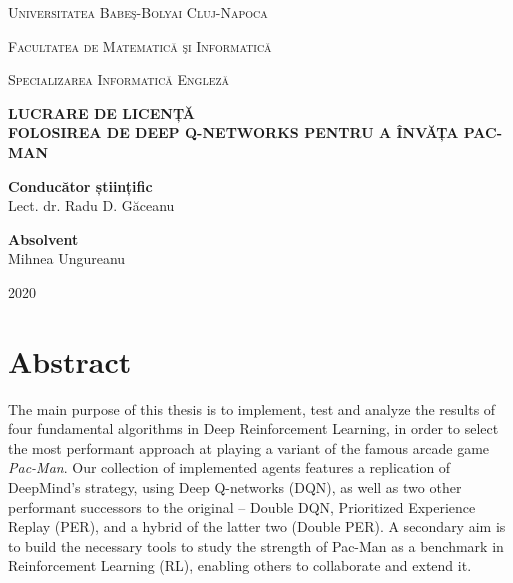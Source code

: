 \documentclass[12pt,twoside]{report}
\newcommand\blankpage{%
    \null
    \thispagestyle{empty}%
    \addtocounter{page}{-1}%
    \newpage}
\begin{document}
\begin{titlepage}
    \center %
    
    {\scshape\LARGE Universitatea Babeş-Bolyai Cluj-Napoca \par}
    \vspace{0.125cm}
    {\scshape\LARGE Facultatea de Matematică şi Informatică \par}
    \vspace{0.125cm}
    {\scshape\LARGE Specializarea Informatică Engleză \par}
    \vspace{5cm}
    
    {
        \bfseries
        \LARGE LUCRARE DE LICENȚĂ \\[1.5cm]
        \LARGE \uppercase{Folosirea de Deep Q-networks pentru a învĂȚa Pac-Man}
    }\\[4cm]
    
    \begin{flushleft}
        \Large
            \textbf{Conducător științific}
            \vspace{0.2cm}\\
        \Large
            Lect. dr. Radu D. Găceanu
            \vspace{0.125cm}\\
    \end{flushleft}
    
    \begin{flushright}
        \Large
            \textbf{Absolvent}
            \vspace{0.2cm}\\
        \Large
            Mihnea Ungureanu
    \end{flushright}
    
    \vfill
    
    {\center \large 2020}
    
\end{titlepage}

\blankpage

\chapter*{Abstract}
\small
The main purpose of this thesis is to implement, test and analyze the results of four fundamental algorithms in Deep Reinforcement Learning, in order to select the most performant approach at playing a variant of the famous arcade game \emph{Pac-Man}.
Our collection of implemented agents features a replication of DeepMind’s strategy, using Deep Q-networks (DQN), as well as two other performant successors to the original -- Double DQN, Prioritized Experience Replay (PER), and a hybrid of the latter two (Double PER).
A secondary aim is to build the necessary tools to study the strength of Pac-Man as a benchmark in Reinforcement Learning (RL), enabling others to collaborate and extend it.
\end{document}
